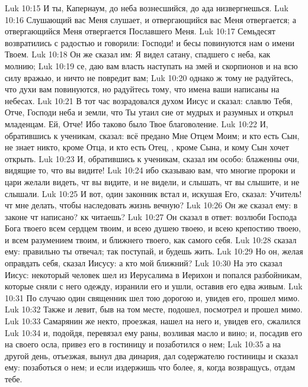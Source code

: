 \vs Luk 10:15 И ты, Капернаум, до неба вознесшийся, до ада низвергнешься.
\vs Luk 10:16 Слушающий вас Меня слушает, и отвергающийся вас Меня отвергается; а отвергающийся Меня отвергается Пославшего Меня.
\rsbpar\vs Luk 10:17 Семьдесят  возвратились с радостью и говорили: Господи! и бесы повинуются нам о имени Твоем.
\vs Luk 10:18 Он же сказал им: Я видел сатану, спадшего с неба, как молнию;
\vs Luk 10:19 се, даю вам власть наступать на змей и скорпионов и на всю силу вражью, и ничто не повредит вам;
\vs Luk 10:20 однако ж тому не радуйтесь, что духи вам повинуются, но радуйтесь тому, что имена ваши написаны на небесах.
\vs Luk 10:21 В тот час возрадовался духом Иисус и сказал: славлю Тебя, Отче, Господи неба и земли, что Ты утаил сие от мудрых и разумных и открыл младенцам. Ей, Отче! Ибо таково было Твое благоволение.
\vs Luk 10:22 И, обратившись к ученикам, сказал: всё предано Мне Отцем Моим; и кто есть Сын, не знает никто, кроме Отца, и кто есть Отец, , кроме Сына, и кому Сын хочет открыть.
\vs Luk 10:23 И, обратившись к ученикам, сказал им особо: блаженны очи, видящие то, что вы видите!
\vs Luk 10:24 ибо сказываю вам, что многие пророки и цари желали видеть, чт вы видите, и не видели, и слышать, чт вы слышите, и не слышали.
\rsbpar\vs Luk 10:25 И вот, один законник встал и, искушая Его, сказал: Учитель! чт мне делать, чтобы наследовать жизнь вечную?
\vs Luk 10:26 Он же сказал ему: в законе чт написано? кк читаешь?
\vs Luk 10:27 Он сказал в ответ: возлюби Господа Бога твоего всем сердцем твоим, и всею душею твоею, и всею крепостию твоею, и всем разумением твоим, и ближнего твоего, как самого себя.
\vs Luk 10:28  сказал ему: правильно ты отвечал; так поступай, и будешь жить.
\vs Luk 10:29 Но он, желая оправдать себя, сказал Иисусу: а кто мой ближний?
\vs Luk 10:30 На это сказал Иисус: некоторый человек шел из Иерусалима в Иерихон и попался разбойникам, которые сняли с него одежду, изранили его и ушли, оставив его едва живым.
\vs Luk 10:31 По случаю один священник шел тою дорогою и, увидев его, прошел мимо.
\vs Luk 10:32 Также и левит, быв на том месте, подошел, посмотрел и прошел мимо.
\vs Luk 10:33 Самарянин же некто, проезжая, нашел на него и, увидев его, сжалился
\vs Luk 10:34 и, подойдя, перевязал ему раны, возливая масло и вино; и, посадив его на своего осла, привез его в гостиницу и позаботился о нем;
\vs Luk 10:35 а на другой день, отъезжая, вынул два динария, дал содержателю гостиницы и сказал ему: позаботься о нем; и если издержишь что более, я, когда возвращусь, отдам тебе.
